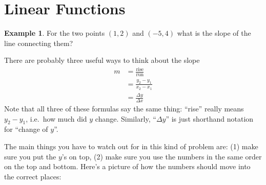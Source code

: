 \documentclass[oneside]{book}
\theoremstyle{definition}
\newtheorem{example}{Example}
\theoremstyle{solution}
\newtheorem*{solution}{Solution}
\newenvironment{solution}{\vspace{2in}\comment}{\endcomment}
\begin{document}
\section{Linear Functions}


\begin{example}
  For the two points $(1,2)$ and $(-5,4)$ what is the slope of the
  line connecting them?
\end{example}
 
\begin{solution}
There are probably three useful ways to think about the slope
\begin{align*}
m & = \frac{\text{rise}}{\text{run}}\\
  & = \frac{y_2-y_1}{x_2-x_1}\\
  & = \frac{\Delta y}{\Delta x}
\end{align*}
Note that all three of these formulas say the same thing: ``rise''
really means $y_2-y_1$, i.e.\ how much did $y$ change.  Similarly,
``$\Delta y$'' is just shorthand notation for ``change of $y$''.

The main things you have to watch out for in this kind of problem are:
(1) make sure you put the $y$'s on top, (2) make sure you use the
numbers in the same order on the top and bottom.  Here's a picture of
how the numbers should move into the correct places:
\begin{center}
\end{center}
\end{solution}
\end{document}
